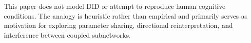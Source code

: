 
This paper does not model DID or attempt to reproduce human cognitive conditions.
The analogy is heuristic rather than empirical and primarily serves as motivation for exploring parameter sharing, directional reinterpretation, and interference between coupled subnetworks.


